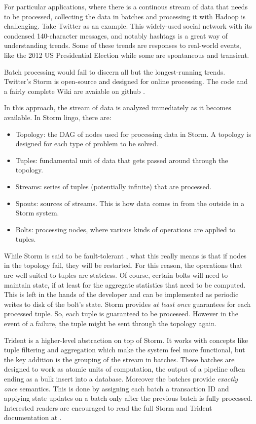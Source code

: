\documentclass{article}
\begin{document}
For particular applications, where there is a continous stream
of data that needs to be processed, collecting the data in batches and
processing it with Hadoop is challenging.
Take Twitter as an example. This widely-used social network with its condensed
140-character messages, and notably hashtags is a great way of understanding
trends. Some of these trends are responses to real-world events, like the 2012
US Presidential Election while some are spontaneous and transient.

Batch processing would fail to discern all but the longest-running
trends. Twitter's Storm is open-source and designed for online processing.
The code and a fairly complete Wiki are avaiable on github \cite{storm}.

In this approach, the stream of data is analyzed immediately as it becomes
available. In Storm lingo, there are:
\begin{itemize}
    \item Topology: the DAG of nodes used for processing data in Storm. A
        topology is designed for each type of problem to be solved.
    \item Tuples: fundamental unit of data that gets passed around through the
        topology.
    \item Streams: series of tuples (potentially infinite) that are processed.
    \item Spouts: sources of streams. This is how data comes in from the
        outside in a Storm system.
    \item Bolts: processing nodes, where various kinds of operations are
        applied to tuples.
\end{itemize}

While Storm is said to be fault-tolerant \cite{storm}, what this really means
is that if nodes in the topology fail, they will be restarted. For this reason,
the operations that are well suited to tuples are stateless.
Of course, certain bolts will need to maintain state, if at least for the
aggregate statistics that need to be computed. This is left in the hands of the
developer and can be implemented as periodic writes to disk of the bolt's
state.
Storm provides \textit{at least once} guarantees for each processed tuple. So,
each tuple is guaranteed to be proceseed. However in the event of a failure,
the tuple might be sent through the topology again.

Trident \cite{storm} is a higher-level abstraction on top of Storm. It works
with concepts like tuple filtering and aggregation which make the system feel
more functional, but the key addition is the grouping of the stream in batches.
These batches are designed to work as atomic units of computation, the output
of a pipeline often ending as a bulk insert into a database.
Moreover the batches provide \textit{exactly once} semantics. This is done by
assigning each batch a transaction ID and applying state updates on a batch
only after the previous batch is fully processed.
Interested readers are encouraged to read the full Storm and Trident
documentation at \cite{storm}.
\end{document}
